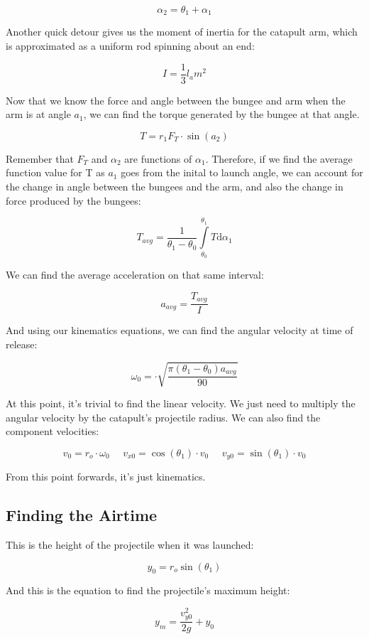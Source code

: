\documentclass[10pt]{article}
\begin{document}
\begin{flushleft}
    $$\alpha_2 = \theta_1 + \alpha_1$$

    Another quick detour gives us the moment of inertia for the catapult arm, which is approximated as a uniform rod spinning about an end:

    $$I = \frac{1}{3} l_a m^2$$

    Now that we know the force and angle between the bungee and arm when the arm is at angle $a_1$, we can find the torque generated by the bungee at that angle.

    $$ T = r_1 F_T \cdot \sin(a_2) $$

    Remember that $F_T$ and $\alpha_2$ are functions of $\alpha_1$. 
    Therefore, if we find the average function value for T as $a_1$ goes from the inital to launch angle, we can account for the change in angle between the bungees and the arm, and also the change in force produced by the bungees:

    $$ T_{avg} = \frac{1}{\theta_1 - \theta_0} \int\limits_{\theta_0}^{\theta_1} T \mathrm{d} \alpha_1$$

    We can find the average acceleration on that same interval:

    $$ a_{avg} = \frac{T_{avg}}{I} $$
    
    And using our kinematics equations, we can find the angular velocity at time of release:

    $$\omega_0 = \cdot \sqrt{\frac{\pi (\theta_1 - \theta_0) a_{avg}}{90}}$$

    At this point, it's trivial to find the linear velocity. We just need to multiply the angular velocity by the catapult's projectile radius. We can also find the component velocities:
    
    $$ v_0 = r_o \cdot \omega_0  \ \ \ \ \ \ v_{x0} = \cos(\theta_1) \cdot v_0 \ \ \ \ \ \ v_{y0} = \sin(\theta_1) \cdot v_0 $$

    From this point forwards, it's just kinematics.

    \subsection{Finding the Airtime}

    This is the height of the projectile when it was launched:

    $$ y_0 = r_o \sin(\theta_1) $$

    And this is the equation to find the projectile's maximum height:

    $$ y_m = \frac{v_{y0}^2}{2g} + y_0 $$


\end{flushleft}
\end{document}
